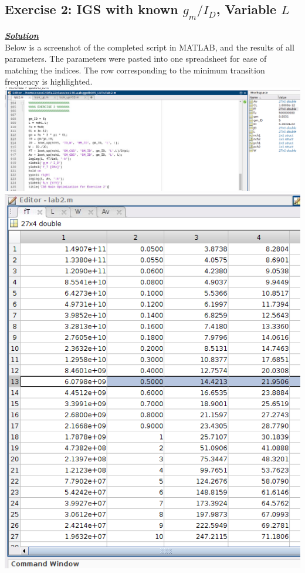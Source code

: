 \documentclass[12pt, fleqn]{article}
\begin{document}
\subsection{Exercise 2: IGS with known $g_m / I_D$, Variable $L$}
\underline{\textbf{\textit{Solution}}}\\[0.25cm]
Below is a screenshot of the completed script in MATLAB, and the results of all parameters.  The parameters were pasted into one spreadsheet for ease of matching the indices.  The row corresponding to the minimum transition frequency is highlighted.\\[0.25cm]
\includegraphics[scale=0.375, center]{mat_res2.PNG}\\[0.25cm]
\includegraphics[scale=0.475, center]{mat_res3.PNG}\\[0.25cm]
\end{document}

